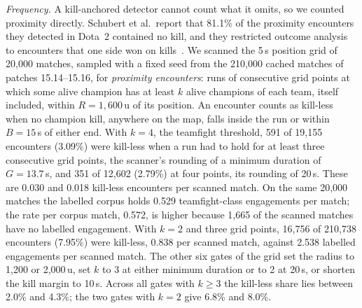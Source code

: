 \emph{Frequency.} A kill-anchored detector cannot count what it omits, so we counted proximity
directly. Schubert et al.\ report that 81.1\% of the proximity encounters they detected in Dota~2
contained no kill, and they restricted outcome analysis to encounters that one side won on
kills~\cite{schubert2016encounter}.
We scanned the 5\,s position grid of 20,000 matches, sampled with a fixed seed from the 210,000 cached
matches of patches 15.14--15.16, for \emph{proximity encounters}: runs of consecutive grid points at which
some alive champion has at least $k$ alive champions of each team, itself included, within
$R = 1{,}600$\,u of its position. An encounter counts as kill-less when no champion kill, anywhere on the
map, falls inside the run or within $B = 15$\,s of either end. With $k = 4$, the teamfight threshold, 591
of 19,155 encounters (3.09\%) were kill-less when a run had to hold for at least three consecutive grid
points, the scanner's rounding of a minimum duration of $G = 13.7$\,s, and 351 of 12,602 (2.79\%) at four
points, its rounding of 20\,s. These are 0.030 and 0.018 kill-less encounters per scanned match. On the
same 20,000 matches the labelled corpus holds 0.529 teamfight-class engagements per match; the rate per
corpus match, 0.572, is higher because 1,665 of the scanned matches have no labelled engagement. With
$k = 2$ and three grid points, 16,756 of 210,738 encounters (7.95\%) were kill-less, 0.838 per scanned
match, against 2.538 labelled engagements per scanned match. The other six gates of the grid set the
radius to 1,200 or 2,000\,u, set $k$ to 3 at either minimum duration or to 2 at 20\,s, or shorten the kill
margin to 10\,s. Across all gates with $k \geq 3$ the kill-less share lies between 2.0\% and 4.3\%; the two
gates with $k = 2$ give 6.8\% and 8.0\%.
